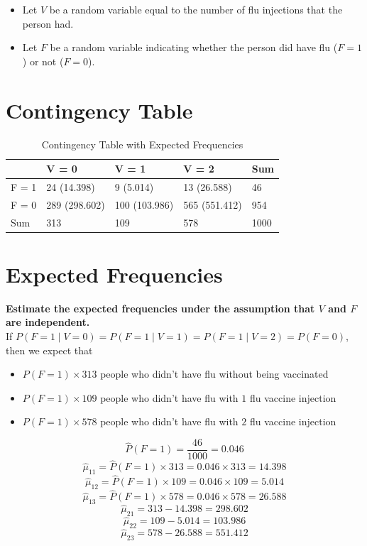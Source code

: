 \documentclass[
]{book}
\providecommand{\tightlist}{%
  \setlength{\itemsep}{0pt}\setlength{\parskip}{0pt}}
\begin{document}
\begin{itemize}
\tightlist
\item
  Let \(V\) be a random variable equal to the number of flu injections that the person had.
\item
  Let \(F\) be a random variable indicating whether the person did have flu (\(F = 1\)) or not (\(F = 0\)).
\end{itemize}

\section{Contingency Table}\label{contingency-table}

\begin{table}

\caption{\label{tab:unnamed-chunk-10}Contingency Table with Expected Frequencies}
\centering
\begin{tabular}[t]{l|l|l|l|l}
\hline
  & V = 0 & V = 1 & V = 2 & Sum\\
\hline
F = 1 & 24 (14.398) & 9 (5.014) & 13 (26.588) & 46\\
\hline
F = 0 & 289 (298.602) & 100 (103.986) & 565 (551.412) & 954\\
\hline
Sum & 313 & 109 & 578 & 1000\\
\hline
\end{tabular}
\end{table}

\section{Expected Frequencies}\label{expected-frequencies}

\textbf{Estimate the expected frequencies under the assumption that \(V\) and \(F\) are independent.}\\
If \(P(F = 1 \mid V = 0) = P(F = 1 \mid V = 1) = P(F = 1 \mid V = 2) = P(F = 0)\), then we expect that

\begin{itemize}
\tightlist
\item
  \(P(F = 1) \times 313\) people who didn't have flu without being vaccinated
\item
  \(P(F = 1) \times 109\) people who didn't have flu with \(1\) flu vaccine injection
\item
  \(P(F = 1) \times 578\) people who didn't have flu with \(2\) flu vaccine injection
\end{itemize}

\[\hat{P}(F = 1) = \frac{46}{1000} = 0.046\]
\[\hat{\mu}_{11} = \hat{P}(F = 1) \times 313 = 0.046 \times 313 = 14.398\]
\[\hat{\mu}_{12} = \hat{P}(F = 1) \times 109 = 0.046 \times 109 = 5.014\]
\[\hat{\mu}_{13} = \hat{P}(F = 1) \times 578 = 0.046 \times 578 = 26.588\]
\[\hat{\mu}_{21} = 313 - 14.398 = 298.602\]
\[\hat{\mu}_{22} = 109 - 5.014 = 103.986\]
\[\hat{\mu}_{23} = 578 - 26.588 = 551.412\]
\end{document}
